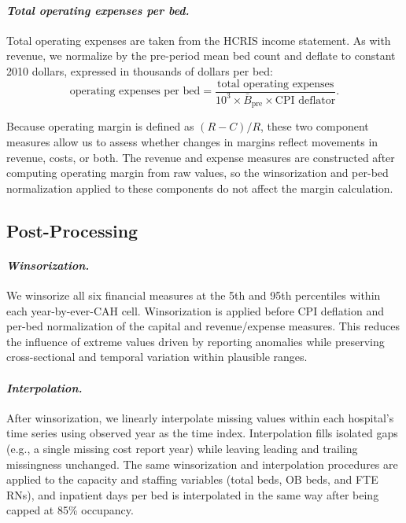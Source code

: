 \documentclass[a4paper, 12pt]{article}
\begin{document}
\paragraph{\textit{Total operating expenses per bed.}} Total operating expenses are taken from the HCRIS income statement. As with revenue, we normalize by the pre-period mean bed count and deflate to constant 2010 dollars, expressed in thousands of dollars per bed:
$$
\text{operating expenses per bed} = \frac{\text{total operating expenses}}{10^3 \times \bar{B}_{\text{pre}} \times \text{CPI deflator}}.
$$

\noindent Because operating margin is defined as $(R - C)/R$, these two component measures allow us to assess whether changes in margins reflect movements in revenue, costs, or both. The revenue and expense measures are constructed after computing operating margin from raw values, so the winsorization and per-bed normalization applied to these components do not affect the margin calculation.

\subsection{Post-Processing}

\paragraph{\textit{Winsorization.}} We winsorize all six financial measures at the 5th and 95th percentiles within each year-by-ever-CAH cell. Winsorization is applied before CPI deflation and per-bed normalization of the capital and revenue/expense measures. This reduces the influence of extreme values driven by reporting anomalies while preserving cross-sectional and temporal variation within plausible ranges.

\paragraph{\textit{Interpolation.}} After winsorization, we linearly interpolate missing values within each hospital's time series using observed year as the time index. Interpolation fills isolated gaps (e.g., a single missing cost report year) while leaving leading and trailing missingness unchanged. The same winsorization and interpolation procedures are applied to the capacity and staffing variables (total beds, OB beds, and FTE RNs), and inpatient days per bed is interpolated in the same way after being capped at 85\% occupancy.
\end{document}
